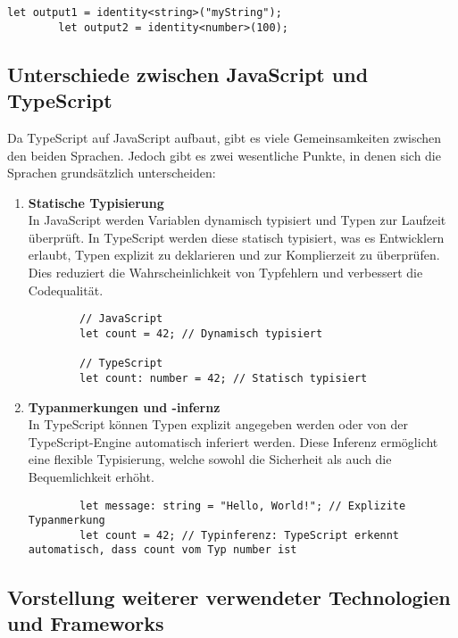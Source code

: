 \begin{itemize}
\begin{lstlisting}[caption={Beispiel: Generics in TypeScript}]
        let output1 = identity<string>("myString");
        let output2 = identity<number>(100);
    \end{lstlisting}
\end{itemize}

\subsection[Unterschiede zwischen JavaScript und TypeScript]{Unterschiede zwischen JavaScript und TypeScript}
Da TypeScript auf JavaScript aufbaut, gibt es viele Gemeinsamkeiten zwischen den beiden Sprachen.
Jedoch gibt es zwei wesentliche Punkte, in denen sich die Sprachen grundsätzlich unterscheiden:

\begin{enumerate}
    \item \textbf{Statische Typisierung} \\
    In JavaScript werden Variablen dynamisch typisiert und Typen zur Laufzeit überprüft. In TypeScript werden diese statisch typisiert, was es Entwicklern erlaubt, Typen explizit zu deklarieren und zur Komplierzeit zu überprüfen.
    Dies reduziert die Wahrscheinlichkeit von Typfehlern und verbessert die Codequalität.
    \begin{lstlisting}
        // JavaScript
        let count = 42; // Dynamisch typisiert

        // TypeScript
        let count: number = 42; // Statisch typisiert
    \end{lstlisting}
    \item \textbf{Typanmerkungen und -infernz} \\
    In TypeScript können Typen explizit angegeben werden oder von der TypeScript-Engine automatisch inferiert werden.
    Diese Inferenz ermöglicht eine flexible Typisierung, welche sowohl die Sicherheit als auch die Bequemlichkeit erhöht.
    \begin{lstlisting}
        let message: string = "Hello, World!"; // Explizite Typanmerkung
        let count = 42; // Typinferenz: TypeScript erkennt automatisch, dass count vom Typ number ist
    \end{lstlisting}
\end{enumerate}

\subsection[Vorstellung weiterer verwendeter Technologien und Frameworks]{Vorstellung weiterer verwendeter Technologien und Frameworks}


